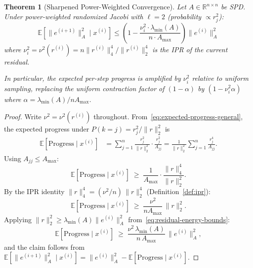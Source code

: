 \documentclass[pdflatex,sn-mathphys-num]{sn-jnl}%
\newcommand{\R}{\mathbb{R}}
\newcommand{\E}{\mathbb{E}}
\newcommand{\norm}[2]{\|#1\|_{#2}}
\newcommand{\Anorm}[1]{\|#1\|_{A}}
\newcommand{\lmin}{\lambda_{\min}}
\theoremstyle{thmstyleone}%
\newtheorem{theorem}{Theorem}%
\theoremstyle{thmstyletwo}%
\theoremstyle{thmstylethree}%
\begin{document}
\begin{theorem}[Sharpened Power-Weighted Convergence]
\label{thm:sharp-power}
Let $A \in \R^{n \times n}$ be SPD. Under power-weighted randomized Jacobi with $\ell = 2$ (probability $\propto r_j^2$):
\begin{equation}
\label{eq:sharp-power}
\E[\Anorm{e^{(i+1)}}^2 \mid x^{(i)}] \leq \left(1 - \frac{\nu_i^2 \cdot \lmin(A)}{n \cdot A_{\max}}\right) \Anorm{e^{(i)}}^2
\end{equation}
where $\nu_i^2 = \nu^2(r^{(i)}) = n\norm{r^{(i)}}{4}^4 / \norm{r^{(i)}}{2}^4$ is the IPR of the current residual.

In particular, the expected per-step progress is amplified by $\nu_i^2$ relative to uniform sampling, replacing the uniform contraction factor of $(1-\alpha)$ by $(1 - \nu_i^2\alpha)$ where $\alpha = \lmin(A)/nA_{\max}$.
\end{theorem}

\begin{proof}
Write $\nu^2 = \nu^2(r^{(i)})$ throughout. From~\eqref{eq:expected-progress-general},
the expected progress under $P(k=j) = r_j^2/\|r\|_2^2$ is
\begin{align}
\E[\mathrm{Progress} \mid x^{(i)}]
&= \sum_{j=1}^n \frac{r_j^2}{\|r\|_2^2}\cdot \frac{r_j^2}{A_{jj}}
 = \frac{1}{\|r\|_2^2}\sum_{j=1}^n \frac{r_j^4}{A_{jj}}.
\end{align}
Using $A_{jj} \leq A_{\max}$:
\begin{equation}
\E[\mathrm{Progress} \mid x^{(i)}]
\;\geq\; \frac{1}{A_{\max}}\cdot \frac{\|r\|_4^4}{\|r\|_2^2}.
\end{equation}
By the IPR identity $\|r\|_4^4 = (\nu^2/n)\,\|r\|_2^4$
(Definition~\ref{def:ipr}):
\begin{equation}
\E[\mathrm{Progress} \mid x^{(i)}]
\;\geq\; \frac{\nu^2}{n A_{\max}}\,\|r\|_2^2.
\end{equation}
Applying $\|r\|_2^2 \geq \lmin(A)\Anorm{e^{(i)}}^2$ from~\eqref{eq:residual-energy-bounds}:
\[
\E[\mathrm{Progress} \mid x^{(i)}]
\;\geq\; \frac{\nu^2\,\lmin(A)}{n\,A_{\max}}\,\Anorm{e^{(i)}}^2,
\]
and the claim follows from $\E[\Anorm{e^{(i+1)}}^2 \mid x^{(i)}] =
\Anorm{e^{(i)}}^2 - \E[\mathrm{Progress} \mid x^{(i)}]$.
\end{proof}
\end{document}
